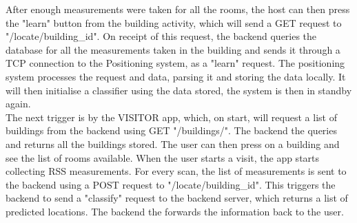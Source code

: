 After enough measurements were taken for all the rooms, the host can then press the "learn" button from the building activity, which will send a GET request to "/locate/building\_id". On receipt of this request, the backend queries the database for all the measurements taken in the building and sends it through a TCP connection to the Positioning system, as a "learn" request. The positioning system processes the request and data, parsing it and storing the data locally. It will then initialise a classifier using the data stored, the system is then in standby again. \\
The next trigger is by the VISITOR app, which, on start, will request a list of buildings from the backend using GET "/buildings/". The backend the queries and returns all the buildings stored. The user can then press on a building and see the list of rooms available. When the user starts a visit, the app starts collecting RSS measurements. For every scan, the list of measurements is sent to the backend using a POST request to "/locate/building\_id". This triggers the backend to send a "classify" request to the backend server, which returns a list of predicted locations. The backend the forwards the information back to the user.

